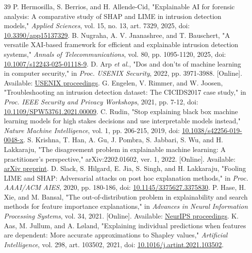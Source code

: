 \documentclass[journal,letterpaper]{IEEEtran}
\begin{document}
\begin{thebibliography}{39}
 P. Hermosilla, S. Berrios, and H. Allende-Cid, "Explainable AI for forensic analysis: A comparative study of SHAP and LIME in intrusion detection models," \emph{Applied Sciences}, vol. 15, no. 13, art. 7329, 2025, doi: \href{https://doi.org/10.3390/app15137329}{10.3390/app15137329}.
 B. Nugraha, A. V. Jnanashree, and T. Bauschert, "A versatile XAI-based framework for efficient and explainable intrusion detection systems," \emph{Annals of Telecommunications}, vol. 80, pp. 1095-1120, 2025, doi: \href{https://doi.org/10.1007/s12243-025-01118-9}{10.1007/s12243-025-01118-9}.
 D. Arp \emph{et al.}, "Dos and don'ts of machine learning in computer security," in \emph{Proc. USENIX Security}, 2022, pp. 3971-3988. [Online]. Available: \href{https://www.usenix.org/conference/usenixsecurity22/presentation/arp}{USENIX proceedings}.
 G. Engelen, V. Rimmer, and W. Joosen, "Troubleshooting an intrusion detection dataset: The CICIDS2017 case study," in \emph{Proc. IEEE Security and Privacy Workshops}, 2021, pp. 7-12, doi: \href{https://doi.org/10.1109/SPW53761.2021.00009}{10.1109/SPW53761.2021.00009}.
 C. Rudin, "Stop explaining black box machine learning models for high stakes decisions and use interpretable models instead," \emph{Nature Machine Intelligence}, vol. 1, pp. 206-215, 2019, doi: \href{https://doi.org/10.1038/s42256-019-0048-x}{10.1038/s42256-019-0048-x}.
 S. Krishna, T. Han, A. Gu, J. Pombra, S. Jabbari, S. Wu, and H. Lakkaraju, "The disagreement problem in explainable machine learning: A practitioner's perspective," arXiv:2202.01602, ver. 1, 2022. [Online]. Available: \href{https://arxiv.org/abs/2202.01602v1}{arXiv preprint}.
 D. Slack, S. Hilgard, E. Jia, S. Singh, and H. Lakkaraju, "Fooling LIME and SHAP: Adversarial attacks on post hoc explanation methods," in \emph{Proc. AAAI/ACM AIES}, 2020, pp. 180-186, doi: \href{https://doi.org/10.1145/3375627.3375830}{10.1145/3375627.3375830}.
 P. Hase, H. Xie, and M. Bansal, "The out-of-distribution problem in explainability and search methods for feature importance explanations," in \emph{Advances in Neural Information Processing Systems}, vol. 34, 2021. [Online]. Available: \href{https://proceedings.neurips.cc/paper_files/paper/2021/hash/1def1713ebf17722cbe300cfc1c88558-Abstract.html}{NeurIPS proceedings}.
 K. Aas, M. Jullum, and A. L{\o}land, "Explaining individual predictions when features are dependent: More accurate approximations to Shapley values," \emph{Artificial Intelligence}, vol. 298, art. 103502, 2021, doi: \href{https://doi.org/10.1016/j.artint.2021.103502}{10.1016/j.artint.2021.103502}.

\end{thebibliography}
\end{document}
